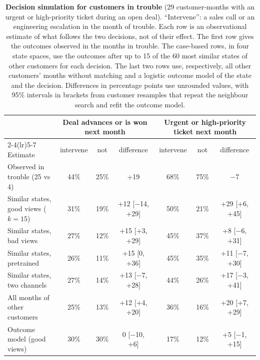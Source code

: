 \documentclass[11pt]{article}
\begin{document}
\begin{table}[h]
\centering
\small
\caption{\textbf{Decision simulation for customers in trouble} (29 customer-months with an urgent or high-priority ticket during an open deal). ``Intervene'': a sales call or an engineering escalation in the month of trouble. Each row is an observational estimate of what follows the two decisions, not of their effect. The first row gives the outcomes observed in the months in trouble. The case-based rows, in four state spaces, use the outcomes after up to 15 of the 60 most similar states of other customers for each decision. The last two rows use, respectively, all other customers' months without matching and a logistic outcome model of the state and the decision. Differences in percentage points use unrounded values, with 95\% intervals in brackets from customer resamples that repeat the neighbour search and refit the outcome model.}
\label{tab:simulate}
\setlength{\tabcolsep}{3.2pt}\begin{tabular}{lcccccc}
\toprule
& \multicolumn{3}{c}{Deal advances or is won next month} & \multicolumn{3}{c}{Urgent or high-priority ticket next month} \\
\cmidrule(lr){2-4}\cmidrule(lr){5-7}
Estimate & intervene & not & difference & intervene & not & difference \\
\midrule
Observed in trouble (25 vs 4) & 44\% & 25\% & +19 & 68\% & 75\% & $-$7 \\
Similar states, good views ($k = 15$) & 31\% & 19\% & +12 [$-$14, +29] & 50\% & 21\% & +29 [+6, +45] \\
Similar states, bad views & 27\% & 12\% & +15 [+3, +29] & 45\% & 37\% & +8 [$-$6, +31] \\
Similar states, pretrained & 26\% & 11\% & +15 [0, +36] & 45\% & 35\% & +11 [$-$7, +30] \\
Similar states, two channels & 27\% & 14\% & +13 [$-$7, +28] & 44\% & 26\% & +17 [$-$3, +41] \\
All months of other customers & 25\% & 13\% & +12 [+4, +20] & 36\% & 16\% & +20 [+7, +29] \\
Outcome model (good views) & 30\% & 30\% & 0 [$-$10, +6] & 17\% & 12\% & +5 [$-$1, +15] \\
\bottomrule
\end{tabular}
\end{table}
\end{document}
